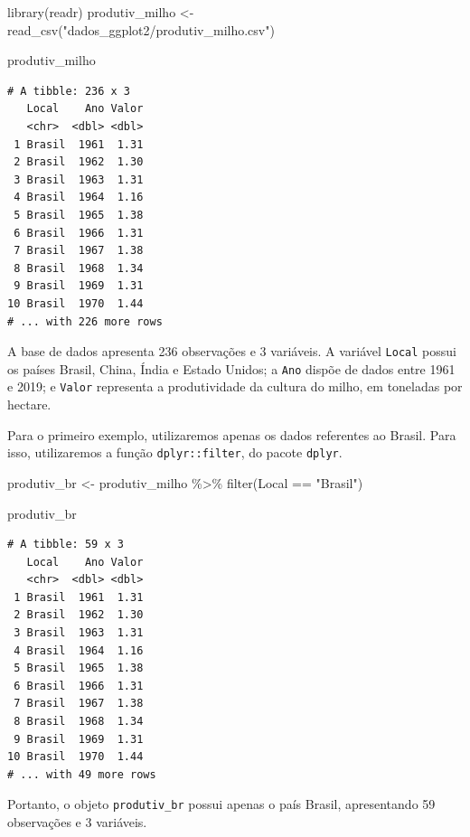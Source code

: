 \documentclass[
  brazilian,
]{book}
\newenvironment{Shaded}{\begin{snugshade}}{\end{snugshade}}
\newcommand{\FunctionTok}[1]{\textcolor[rgb]{0.00,0.00,0.00}{#1}}
\newcommand{\NormalTok}[1]{#1}
\newcommand{\OtherTok}[1]{\textcolor[rgb]{0.56,0.35,0.01}{#1}}
\newcommand{\SpecialCharTok}[1]{\textcolor[rgb]{0.00,0.00,0.00}{#1}}
\newcommand{\StringTok}[1]{\textcolor[rgb]{0.31,0.60,0.02}{#1}}
\begin{document}
\begin{Shaded}
\begin{Highlighting}[]
\FunctionTok{library}\NormalTok{(readr)}
\NormalTok{produtiv\_milho }\OtherTok{\textless{}{-}} \FunctionTok{read\_csv}\NormalTok{(}\StringTok{"dados\_ggplot2/produtiv\_milho.csv"}\NormalTok{)}

\NormalTok{produtiv\_milho}
\end{Highlighting}
\end{Shaded}

\begin{verbatim}
# A tibble: 236 x 3
   Local    Ano Valor
   <chr>  <dbl> <dbl>
 1 Brasil  1961  1.31
 2 Brasil  1962  1.30
 3 Brasil  1963  1.31
 4 Brasil  1964  1.16
 5 Brasil  1965  1.38
 6 Brasil  1966  1.31
 7 Brasil  1967  1.38
 8 Brasil  1968  1.34
 9 Brasil  1969  1.31
10 Brasil  1970  1.44
# ... with 226 more rows
\end{verbatim}

A base de dados apresenta 236 observações e 3 variáveis. A variável \texttt{Local} possui os países Brasil, China, Índia e Estado Unidos; a \texttt{Ano} dispõe de dados entre 1961 e 2019; e \texttt{Valor} representa a produtividade da cultura do milho, em toneladas por hectare.

Para o primeiro exemplo, utilizaremos apenas os dados referentes ao Brasil. Para isso, utilizaremos a função \texttt{dplyr::filter}, do pacote \texttt{dplyr}.

\begin{Shaded}
\begin{Highlighting}[]
\NormalTok{produtiv\_br }\OtherTok{\textless{}{-}}\NormalTok{ produtiv\_milho }\SpecialCharTok{\%\textgreater{}\%} 
  \FunctionTok{filter}\NormalTok{(Local }\SpecialCharTok{==} \StringTok{"Brasil"}\NormalTok{)}

\NormalTok{produtiv\_br}
\end{Highlighting}
\end{Shaded}

\begin{verbatim}
# A tibble: 59 x 3
   Local    Ano Valor
   <chr>  <dbl> <dbl>
 1 Brasil  1961  1.31
 2 Brasil  1962  1.30
 3 Brasil  1963  1.31
 4 Brasil  1964  1.16
 5 Brasil  1965  1.38
 6 Brasil  1966  1.31
 7 Brasil  1967  1.38
 8 Brasil  1968  1.34
 9 Brasil  1969  1.31
10 Brasil  1970  1.44
# ... with 49 more rows
\end{verbatim}

Portanto, o objeto \texttt{produtiv\_br} possui apenas o país Brasil, apresentando 59 observações e 3 variáveis.
\end{document}
